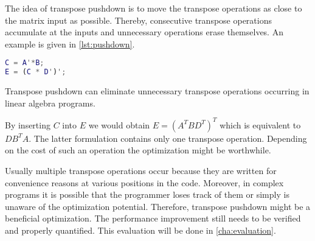 The idea of transpose pushdown is to move the transpose operations as close to the matrix input as possible.
Thereby, consecutive transpose operations accumulate at the inputs and unnecessary operations erase themselves.
An example is given in \cref{lst:pushdown}.

\begin{listing}[!h]
	\begin{CenteredBox}
		\begin{lstlisting}[language=Matlab]
C = A'*B;
E = (C * D')';
		\end{lstlisting}
	\end{CenteredBox}
	\caption{Transpose pushdown can eliminate unnecessary transpose operations occurring in linear algebra programs.}
	\label{lst:pushdown}
\end{listing}

By inserting $C$ into $E$ we would obtain $E=(A^T BD^T)^T$ which is equivalent to $DB^T A$.
The latter formulation contains only one transpose operation.
Depending on the cost of such an operation the optimization might be worthwhile.

Usually multiple transpose operations occur because they are written for convenience reasons at various positions in the code.
Moreover, in complex programs it is possible that the programmer loses track of them or simply is unaware of the optimization potential.
Therefore, transpose pushdown might be a beneficial optimization.
The performance improvement still needs to be verified and properly quantified.
This evaluation will be done in \cref{cha:evaluation}.